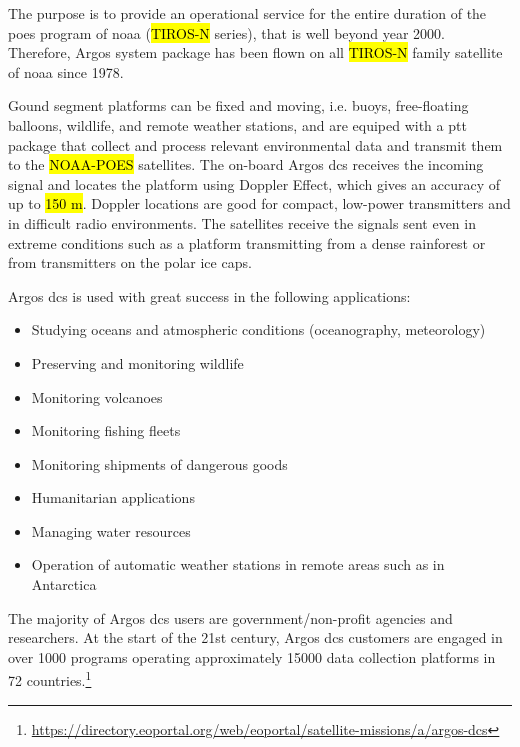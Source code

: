 \documentclass{article}
\begin{document}
The purpose is to provide an operational service for the entire duration of the \ac{poes} program of \ac{noaa} (\hl{TIROS-N} series), that is well beyond year 2000. Therefore, Argos system package has been flown on all \hl{TIROS-N} family satellite of \ac{noaa} since 1978.

Gound segment platforms can be fixed and moving, i.e. buoys, free-floating balloons, wildlife, and remote weather stations, and are equiped with a \ac{ptt}  package that collect and process relevant environmental data and transmit them to the \hl{NOAA-POES} satellites. The on-board Argos \ac{dcs} receives the incoming signal and locates the platform using Doppler Effect, which gives an accuracy of up to \hl{150 m}. Doppler locations are good for compact, low-power transmitters and in difficult radio environments. The satellites receive the signals sent even in extreme conditions such as a platform transmitting from a dense rainforest or from transmitters on the polar ice caps.

Argos \ac{dcs} is used with great success in the following applications:

\begin{itemize}
\item Studying oceans and atmospheric conditions (oceanography, meteorology)
\item Preserving and monitoring wildlife
\item Monitoring volcanoes
\item Monitoring fishing fleets
\item Monitoring shipments of dangerous goods
\item Humanitarian applications
\item Managing water resources
\item Operation of automatic weather stations in remote areas such as in Antarctica
\end{itemize}

The majority of Argos  \ac{dcs} users are government/non-profit agencies and researchers. At the start of the 21st century, Argos  \ac{dcs} customers are engaged in over 1000 programs operating approximately 15000 data collection platforms in 72 countries.\footnote{\url{https://directory.eoportal.org/web/eoportal/satellite-missions/a/argos-dcs}}
\end{document}
